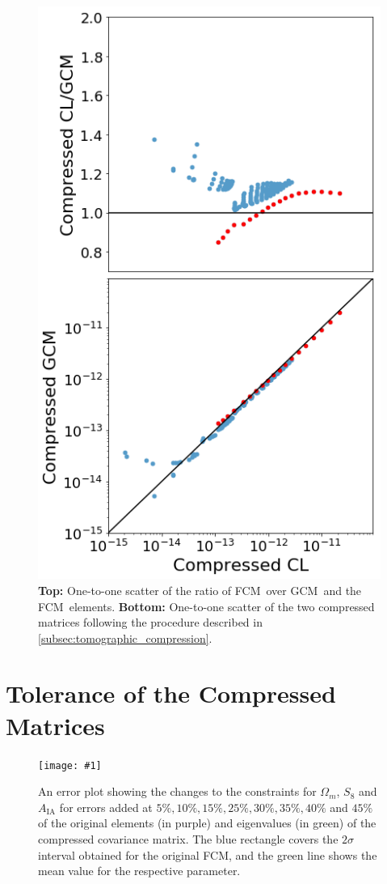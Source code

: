 \documentclass[twocolumn]{\docclass}
\newcommand{\sfig}[2]{
	\texttt{[image: \#1]}
}
\newcommand{\Svwide}[2]{
	\begin{figure}[thbp]
		\sfig{../figures/#1.pdf}{\textwidth}
		\caption{{\small #2}}
		\label{fig:#1}
	\end{figure}
}
\newcommand\full{FCM}
\newcommand\gaussian{GCM}
\begin{document}
	\begin{figure}[thbp]
		\includegraphics[width=0.8\columnwidth]{kl_scatter.png}
		\caption{ \textbf{Top:} One-to-one scatter of the ratio of \full\ over \gaussian\ and the \full\ elements. \label{fig:comp-cov}   \textbf{Bottom:} One-to-one scatter of the two compressed matrices following the procedure described in \ref{subsec:tomographic_compression}. }
	\end{figure}
	
	\section{Tolerance of the Compressed Matrices}
	\label{sec:tolerance}
	
	\Svwide{Tolerance_constraints}{An error plot showing the changes to the constraints for $\Omega_m$, $S_8$ and $A_{\mathrm{IA}}$ for errors added at $5\%, 10\%, 15\%, 25\%, 30\%, 35\%, 40\%$ and $45\%$ of the original elements (in purple) and eigenvalues (in green) of the compressed covariance matrix. The blue rectangle covers the $2 \sigma$ interval obtained for the original \full, and the green line shows the mean value for the respective parameter. }
	
\end{document}
